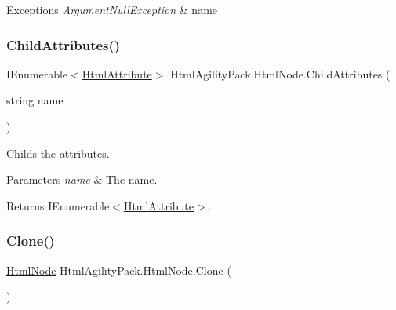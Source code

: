 \begin{DoxyExceptions}{Exceptions}
{\em Argument\+Null\+Exception} & name\\
\hline
\end{DoxyExceptions}
\mbox{\label{class_html_agility_pack_1_1_html_node_abf883a46d69731a438f6b5c00eb24564}} 
\subsubsection{\texorpdfstring{Child\+Attributes()}{ChildAttributes()}}
{\footnotesize\ttfamily I\+Enumerable$<$\hyperlink{class_html_agility_pack_1_1_html_attribute}{Html\+Attribute}$>$ Html\+Agility\+Pack.\+Html\+Node.\+Child\+Attributes (\begin{DoxyParamCaption}\item[{string}]{name }\end{DoxyParamCaption})\hspace{0.3cm}{\ttfamily [inline]}}



Childs the attributes. 


\begin{DoxyParams}{Parameters}
{\em name} & The name.\\
\hline
\end{DoxyParams}
\begin{DoxyReturn}{Returns}
I\+Enumerable$<$\hyperlink{class_html_agility_pack_1_1_html_attribute}{Html\+Attribute}$>$.
\end{DoxyReturn}
\mbox{\label{class_html_agility_pack_1_1_html_node_a206648e51299e69a1129f556968f7fdb}} 
\subsubsection{\texorpdfstring{Clone()}{Clone()}}
{\footnotesize\ttfamily \hyperlink{class_html_agility_pack_1_1_html_node}{Html\+Node} Html\+Agility\+Pack.\+Html\+Node.\+Clone (\begin{DoxyParamCaption}{ }\end{DoxyParamCaption})\hspace{0.3cm}{\ttfamily [inline]}}



